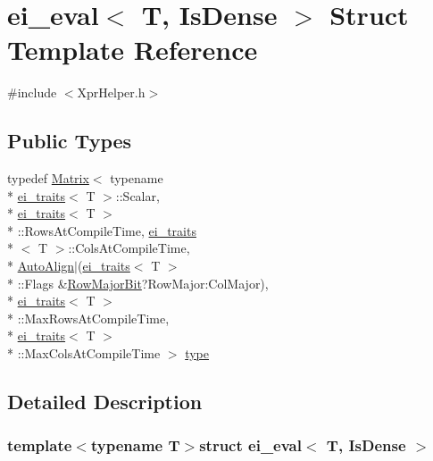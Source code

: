 \hypertarget{structei__eval_3_01_t_00_01_is_dense_01_4}{\section{ei\-\_\-eval$<$ T, Is\-Dense $>$ Struct Template Reference}
\label{structei__eval_3_01_t_00_01_is_dense_01_4}
}


{\ttfamily \#include $<$Xpr\-Helper.\-h$>$}

\subsection*{Public Types}
\begin{DoxyCompactItemize}
\item 
typedef \hyperlink{class_matrix}{Matrix}$<$ typename \\*
\hyperlink{structei__traits}{ei\-\_\-traits}$<$ T $>$\-::Scalar, \\*
\hyperlink{structei__traits}{ei\-\_\-traits}$<$ T $>$\\*
\-::Rows\-At\-Compile\-Time, \hyperlink{structei__traits}{ei\-\_\-traits}\\*
$<$ T $>$\-::Cols\-At\-Compile\-Time, \\*
\hyperlink{_constants_8h_a4d29ca5db06e2ae647d1ec22548a9d2aa02a97bb4792f98916a1156a521fa9813}{Auto\-Align}$|$(\hyperlink{structei__traits}{ei\-\_\-traits}$<$ T $>$\\*
\-::Flags \&\hyperlink{group__flags_ga7bd49e7b260e869e10fb9dc4fd081a85}{Row\-Major\-Bit}?Row\-Major\-:\-Col\-Major), \\*
\hyperlink{structei__traits}{ei\-\_\-traits}$<$ T $>$\\*
\-::Max\-Rows\-At\-Compile\-Time, \\*
\hyperlink{structei__traits}{ei\-\_\-traits}$<$ T $>$\\*
\-::Max\-Cols\-At\-Compile\-Time $>$ \hyperlink{structei__eval_3_01_t_00_01_is_dense_01_4_a04068022a5b85bac5b04070a64260a47}{type}
\end{DoxyCompactItemize}


\subsection{Detailed Description}
\subsubsection*{template$<$typename T$>$struct ei\-\_\-eval$<$ T, Is\-Dense $>$}



